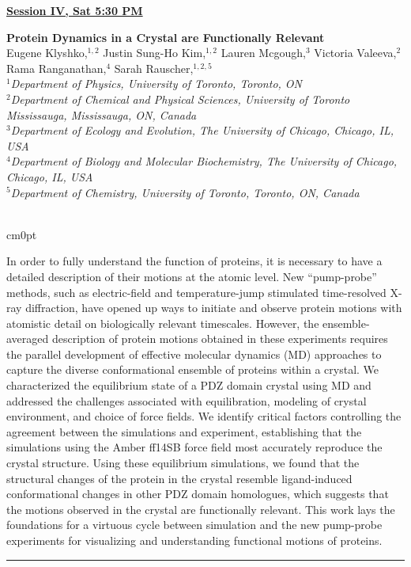 \documentclass[titlepage,oneside,openany,10pt]{book}
\newenvironment{oralabswfig}[7] %
        {
	\FPeval{\cutw}{clip(16.7-#6)}
	\FPeval{\cutl}{round(#7/0.35,3)}
        \begin{flushright}
                \underline{\textbf{#4}}
        \end{flushright}
        \textbf{#1}\\%
        #2\\%
        \textit{#3}\\\\%
        \def\windowpagestuff{\flushright
                \texttt{[image: \#5]}}
        \opencutright
        \begin{cutout}{0}{\cutw cm}{0pt}{\RoundingUpFunction{\cutl}}
        \noindent
        }
        {
        \end{cutout}
        \noindent\rule{15cm}{0.5pt}%
        }
\begin{document}
\newpage

\begin{oralabswfig}
	{Protein Dynamics in a Crystal are Functionally Relevant}
	{Eugene Klyshko,$^{1,2}$ Justin Sung-Ho Kim,$^{1,2}$ Lauren Mcgough,$^{3}$ Victoria Valeeva,$^{2}$ Rama Ranganathan,$^{4}$ Sarah Rauscher,$^{1,2,5}$}
	{
	$^1$Department of Physics, University of Toronto, Toronto, ON\\
	$^2$Department of Chemical and Physical Sciences, University of Toronto Mississauga, Mississauga, ON, Canada\\
	$^3$Department of Ecology and Evolution, The University of Chicago, Chicago, IL, USA\\
	$^4$Department of Biology and Molecular Biochemistry, The University of Chicago, Chicago, IL, USA\\
	$^5$Department of Chemistry, University of Toronto, Toronto, ON, Canada
	}
	{Session IV, Sat 5:30 PM}
	{abstract_figures/Rauscher_Sarah_Oral.pdf}
	{6.0}
	{6.0}
	In order to fully understand the function of proteins, it is necessary to have a detailed description of their motions at the atomic level. New ``pump-probe'' methods, such as electric-field and temperature-jump stimulated time-resolved X-ray diffraction, have opened up ways to initiate and observe protein motions with atomistic detail on biologically relevant timescales. However, the ensemble-averaged description of protein motions obtained in these experiments requires the parallel development of effective molecular dynamics (MD) approaches to capture the diverse conformational ensemble of proteins within a crystal. We characterized the equilibrium state of a PDZ domain crystal using MD and addressed the challenges associated with equilibration, modeling of crystal environment, and choice of force fields. We identify critical factors controlling the agreement between the simulations and experiment, establishing that the simulations using the Amber ff14SB force field most accurately reproduce the crystal structure. Using these equilibrium simulations, we found that the structural changes of the protein in the crystal resemble ligand-induced conformational changes in other PDZ domain homologues, which suggests that the motions observed in the crystal are functionally relevant. This work lays the foundations for a virtuous cycle between simulation and the new pump-probe experiments for visualizing and understanding functional motions of proteins.
	\label{RauscherS}
\end{oralabswfig}
\end{document}
